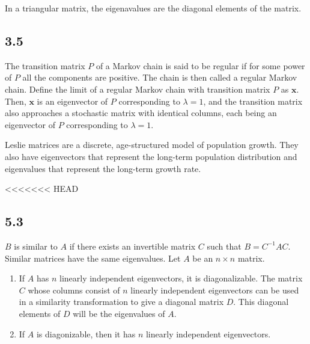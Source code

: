 \documentclass{article}
\begin{document}
    In a triangular matrix, the eigenavalues are the diagonal elements of the matrix.

    \subsection*{3.5}
    The transition matrix $P$ of a Markov chain is said to be regular if for some power of $P$ all the
    components are positive. 
    The chain is then called a regular Markov chain.
    Define the limit of a regular Markov chain with transition matrix $P$ as $\mathbf{x}$. 
    Then, $\mathbf{x}$ is an eigenvector of $P$ corresponding to $\lambda = 1$,
    and the transition matrix also approaches a stochastic matrix with identical columns,
    each being an eigenvector of $P$ corresponding to $\lambda = 1$.
    
    Leslie matrices are a discrete, age-structured model of population growth.
    They also have eigenvectors that represent the long-term population distribution
    and eigenvalues that represent the long-term growth rate.

<<<<<<< HEAD
    \subsection*{5.3}
    $B$ is similar to $A$ if there exists an invertible matrix $C$
    such that $B = C^{-1}AC$.
    Similar matrices have the same eigenvalues. 
    Let $A$ be an $n \times n$ matrix. 
    \begin{enumerate}
        \item If $A$ has $n$ linearly independent eigenvectors, it is diagonalizable.
        The matrix $C$ whose columns consist of $n$ linearly independent eigenvectors 
        can be used in a similarity transformation to give a diagonal matrix $D$. 
        This diagonal elements of $D$ will be the eigenvalues of $A$.
        \item If $A$ is diagonizable, then it has $n$ linearly independent eigenvectors.
    \end{enumerate}
\end{document}
